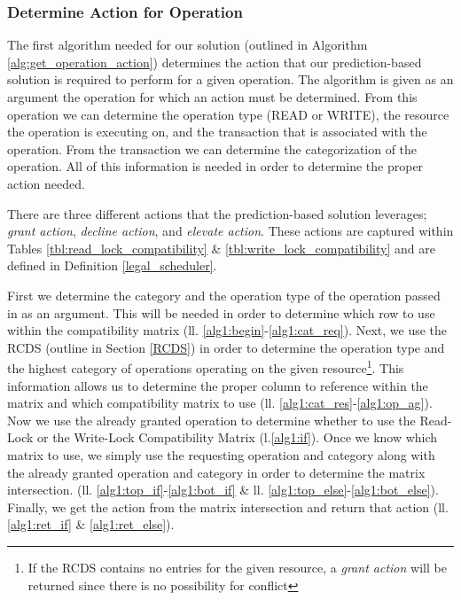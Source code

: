 \documentclass[conference]{IEEEtran}
\begin{document}
\subsubsection{Determine Action for Operation}
The first algorithm needed for our solution (outlined in Algorithm \ref{alg:get_operation_action}) determines the action that our prediction-based solution is required to perform for a given operation. The algorithm is given as an argument the operation for which an action must be determined. From this operation we can determine the operation type (READ or WRITE), the resource the operation is executing on, and the transaction that is associated with the operation. From the transaction we can determine the categorization of the operation. All of this information is needed in order to determine the proper action needed.

There are three different actions that the prediction-based solution leverages; \textit{grant action}, \textit{decline action}, and \textit{elevate action}. These actions are captured within Tables \ref{tbl:read_lock_compatibility} \& \ref{tbl:write_lock_compatibility} and are defined in Definition \ref{legal_scheduler}.

First we determine the category and the operation type of the operation passed in as an argument. This will be needed in order to determine which row to use within the compatibility matrix (ll. \ref{alg1:begin}-\ref{alg1:cat_req}). Next, we use the RCDS (outline in Section \ref{RCDS}) in order to determine the operation type and the highest category of operations operating on the given resource\footnote{If the RCDS contains no entries for the given resource, a \textit{grant action} will be returned since there is no possibility for conflict}. This information allows us to determine the proper column to reference within the matrix and which compatibility matrix to use (ll. \ref{alg1:cat_res}-\ref{alg1:op_ag}). Now we use the already granted operation to determine whether to use the Read-Lock or the Write-Lock Compatibility Matrix (l.\ref{alg1:if}). Once we know which matrix to use, we simply use the requesting operation and category along with the already granted operation and category in order to determine the matrix intersection. (ll. \ref{alg1:top_if}-\ref{alg1:bot_if} \& ll. \ref{alg1:top_else}-\ref{alg1:bot_else}). Finally, we get the action from the matrix intersection and return that action (ll. \ref{alg1:ret_if} \& \ref{alg1:ret_else}).
\end{document}
